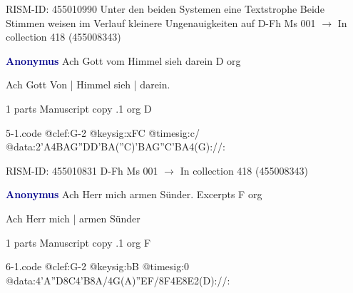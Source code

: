 \documentclass[twocolumn]{book}
\begin{document}
\newline RISM-ID: 455010990
\newline Unter den beiden Systemen eine Textstrophe
\newline Beide Stimmen weisen im Verlauf kleinere Ungenauigkeiten auf
\newline D-Fh  Ms 001
\newline $\rightarrow$ In collection 418 (455008343)

\newline \par \vspace{7pt} \textcolor{darkblue}{\textbf{Anonymus  }}
\newline Ach Gott vom Himmel sieh darein  D  
\newline org
\newline \begin{itshape}[f.16v, at left:] Ach Gott Von | Himmel sieh | darein.\end{itshape} 
\newline \textcolor{darkblue}{}  1 parts  
\newline Manuscript copy
.1  org  D  
\begin{filecontents*}{5-1.code}
@clef:G-2
@keysig:xFC
@timesig:c/
@data:2'A4BAG''DD'BA(''C)'BAG''C'BA4(G)://:
\end{filecontents*}
\newline
%

\newline RISM-ID: 455010831
\newline D-Fh  Ms 001
\newline $\rightarrow$ In collection 418 (455008343)

\newline \par \vspace{7pt} \textcolor{darkblue}{\textbf{Anonymus  }}
\newline Ach Herr mich armen Sünder. Excerpts  F  
\newline org
\newline \begin{itshape}[f.20r, at left:] Ach Herr mich | armen Sünder\end{itshape} 
\newline \textcolor{darkblue}{}  1 parts  
\newline Manuscript copy
.1  org  F  
\begin{filecontents*}{6-1.code}
@clef:G-2
@keysig:bB
@timesig:0
@data:4'A''D8C4'B8A/4G(A)''EF/8F4E8E2(D)://:
\end{filecontents*}
\newline
%
\end{document}
